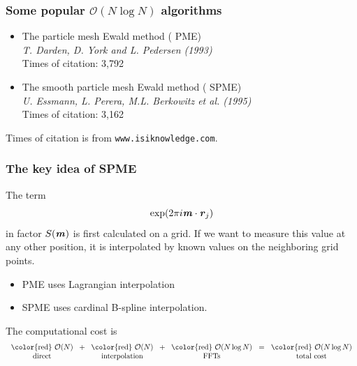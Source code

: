 \documentclass{beamer}
\newcommand{\redc}[1]{{\color{red} #1}}
\newcommand{\bluec}[1]{{\color{blue} #1}}
\renewcommand{\v}[1]{\textbf{\textit{#1}}}
\begin{document}
\begin{frame}
  \frametitle{Some popular $\mathcal O(N\log N)$ algorithms}
  \vfill
  \begin{itemize}
    \item The particle mesh Ewald method (\redc{PME})\\
      \bluec{\textit{T. Darden, D. York and L. Pedersen (1993)}}\\
      Times of citation: \redc{3,792} 
      \vfill
    \item The smooth particle mesh Ewald method (\redc{SPME})\\
      \bluec{\textit{U. Essmann, L. Perera, M.L. Berkowitz et al. (1995)}}\\
      Times of citation: \redc{3,162}
  \end{itemize}
  \vfill
  Times of citation is from \texttt{www.isiknowledge.com}.
  \vfill
\end{frame}


\begin{frame}[label=key-idea-spme]
  \frametitle{The key idea of SPME} 
  \vfill
  The term
  \bluec{$$ \exp (2 \pi i \v m \cdot \v r_j) $$}
  in factor $S(\v m)$ is first calculated on a grid. If we want to
  measure this value at any other position, it is interpolated by
  known values on the neighboring grid points. 
  \begin{itemize}
  \item PME uses \redc{Lagrangian interpolation}
  \item SPME uses  \redc{cardinal B-spline interpolation}.
  \end{itemize}
  
  \vfill
  The computational cost is 
  \begin{align*}
    \begin{tabular}[t]{c}
      \redc{$\mathcal O(N)$}\\
      {direct}
    \end{tabular}
    +
    \begin{tabular}[t]{c}
      \redc{$\mathcal O(N)$}\\
      {interpolation}
    \end{tabular}
    +
    \begin{tabular}[t]{c}
      \redc{$\mathcal O(N\log N)$}\\
      {FFTs}
    \end{tabular}
    =
    \begin{tabular}[t]{c}
      \redc{$\mathcal O(N\log N)$}\\
      {total cost}
    \end{tabular}
  \end{align*} 
 \vfill \hfill
  \hyperlink{Ewald}{}
\end{frame}
\end{document}
